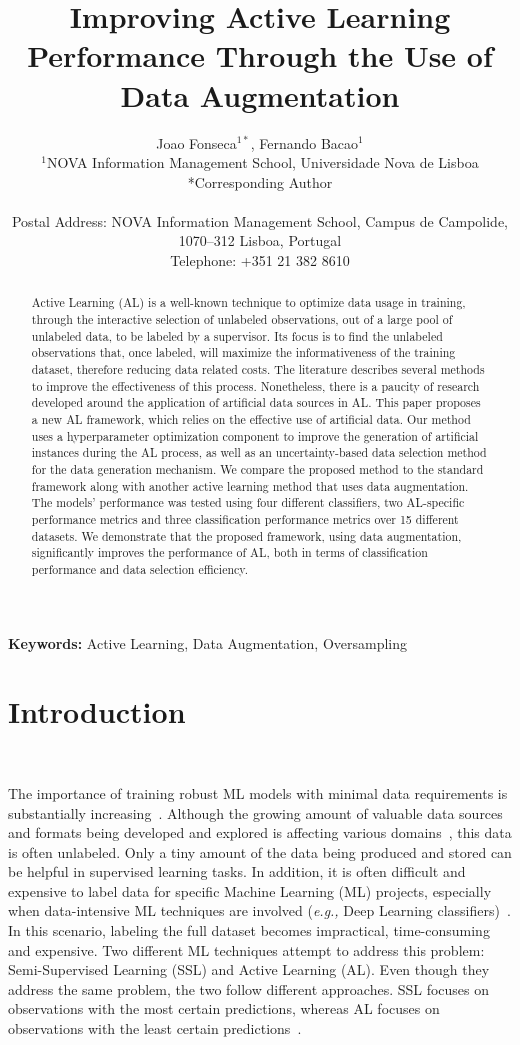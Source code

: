 \documentclass[parskip=full]{scrartcl}
\title{%
    Improving Active Learning Performance Through the Use of Data Augmentation
}
\author{%
	Joao Fonseca\(^{1*}\), Fernando Bacao\(^{1}\)
	\\
	\small{\(^{1}\)NOVA Information Management School, Universidade Nova de Lisboa}
	\\
	\small{*Corresponding Author}
	\\
	\\
	\small{Postal Address: NOVA Information Management School, Campus de
    Campolide, 1070--312 Lisboa, Portugal}
	\\
	\small{Telephone: +351 21 382 8610}
}
\date{}
\begin{document}
\maketitle

\begin{abstract}

    Active Learning (AL) is a well-known technique to optimize data usage in
    training, through the interactive selection of unlabeled observations, out
    of a large pool of unlabeled data, to be labeled by a supervisor. Its
    focus is to find the unlabeled observations that, once labeled, will
    maximize the informativeness of the training dataset, therefore reducing
    data related costs. The literature describes several methods to improve
    the effectiveness of this process. Nonetheless, there is a paucity of
    research developed around the application of artificial data sources in
    AL\@. This paper proposes a new AL framework, which relies on the
    effective use of artificial data. Our method uses a hyperparameter
    optimization component to improve the generation of artificial instances
    during the AL process, as well as an uncertainty-based data selection
    method for the data generation mechanism. We compare the proposed method
    to the standard framework along with another active learning method that
    uses data augmentation. The models' performance was tested using four
    different classifiers, two AL-specific performance metrics and three
    classification performance metrics over 15 different datasets. We
    demonstrate that the proposed framework, using data augmentation,
    significantly improves the performance of AL, both in terms of
    classification performance and data selection efficiency. 

\end{abstract}

\textbf{Keywords:} Active Learning, Data Augmentation, Oversampling

\section{Introduction}~\label{sec:introduction}

The importance of training robust ML models with minimal data
requirements is substantially increasing~\cite{Nath2021, Sverchkov2017,
Li2012}. Although the growing amount of valuable data sources and formats
being developed and explored is affecting various domains~\cite{Li2021}, this
data is often unlabeled. Only a tiny amount of the data being produced and
stored can be helpful in supervised learning tasks. In addition, it is often
difficult and expensive to label data for specific Machine Learning (ML)
projects, especially when data-intensive ML techniques are involved
(\textit{e.g.,} Deep Learning classifiers)~\cite{Nath2021}. In this scenario,
labeling the full dataset becomes impractical, time-consuming and expensive.
Two different ML techniques attempt to address this problem: Semi-Supervised
Learning (SSL) and Active Learning (AL). Even though they address the same
problem, the two follow different approaches. SSL focuses on observations with
the most certain predictions, whereas AL focuses on observations with the
least certain predictions~\cite{Simeoni2020}.
\end{document}

